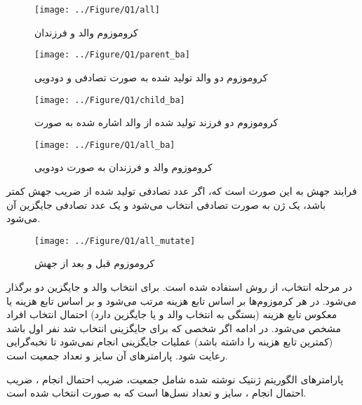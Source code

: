 \vspace{-3cm}
\begin{figure}[H]
	\caption{کروموزوم والد و فرزندان} 
	\vspace{-2cm}
	\centering 
	\texttt{[image: ../Figure/Q1/all]} 
\end{figure}
\vspace{-2cm}


\begin{figure}[H]
	\caption{کروموزوم دو والد تولید شده به صورت تصادفی و دودویی} 
	\vspace{-3.5cm}
	\centering 
	\texttt{[image: ../Figure/Q1/parent\_ba]} 
\end{figure}
\vspace{-3.5cm}
\begin{figure}[H]
	\caption{کروموزوم دو فرزند تولید شده از والد اشاره شده به صورت } 
	\vspace{-3.5cm}
	\centering 
	\texttt{[image: ../Figure/Q1/child\_ba]} 
\end{figure}

\vspace{-3.5cm}
\begin{figure}[H]
	\caption{کروموزوم والد و فرزندان به صورت دودویی} 
	\vspace{-3.5cm}
	\centering 
	\texttt{[image: ../Figure/Q1/all\_ba]} 
\end{figure}
\vspace{-3.5cm}
فرایند جهش به این صورت است که، اگر عدد تصادفی تولید شده از ضریب جهش کمتر باشد، یک ژن به صورت تصادفی انتخاب می‌شود و یک عدد تصادفی جایگزین آن می‌شود.
\begin{figure}[H]
	\caption{کروموزوم قبل و بعد از جهش} 
	\vspace{-3cm}
	\centering 
	\texttt{[image: ../Figure/Q1/all\_mutate]} 
\end{figure}
\vspace{-3cm}
در مرحله انتخاب، از روش
استفاده شده است. برای انتخاب والد و جایگزین دو
برگذار می‌شود. در هر
کرموزوم‌ها بر اساس تابع هزینه مرتب می‌شود و بر اساس تابع هزینه یا معکوس تابع هزینه (بستگی به انتخاب والد و یا جایگزین دارد) احتمال انتخاب افراد مشخص می‌شود. در ادامه اگر شخصی که برای جایگزینی انتخاب شد نفر اول باشد (کمترین تابع هزینه را داشته باشد) عملیات جایگزینی انجام نمی‌شود تا نخبه‌گرایی رعایت شود. پارامتر‌های آن سایز 
و تعداد جمعیت است.

پارامترهای الگوریتم ژنتیک نوشته شده شامل جمعیت، ضریب احتمال انجام
،
ضریب احتمال انجام
،
سایز
و تعداد نسل‌ها است که به صورت
انتخاب شده است.

